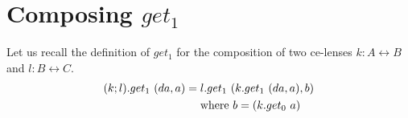 \documentclass[a4paper,10pt]{article}
\begin{document}
%  

\section{Composing $get_1$}
Let us recall the definition of $get_1$ for the composition of two ce-lenses $k : A \leftrightarrow B $ and $l : B \leftrightarrow C$. 
\begin{align*}
 (k;l).get_1~(da,a) &= l.get_1~(k.get_1~(da,a),b) \\
                    & \quad \textnormal{ where } b = (k.get_0~a)
\end{align*}
\end{document}
